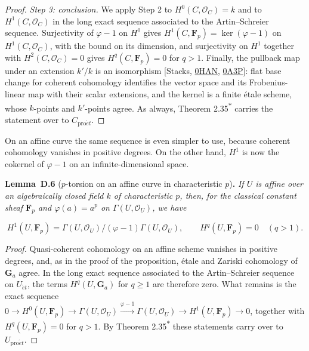 \documentclass[11pt]{article}
\newenvironment{bpstatement}[2]{\par\addvspace{0.6\baselineskip}\noindent\textbf{#1}#2\textbf{.}\enspace\ignorespaces}
  {\par\addvspace{0.4\baselineskip}}
\newenvironment{bpstatementit}[2]{\begin{bpstatement}{#1}{#2}\itshape\ignorespaces}{\end{bpstatement}}
\newcommand{\bpout}[1]{#1\textsuperscript{\hyperlink{bp-outside}{\ensuremath{\ast}}}}
\begin{document}
\begin{proof}[{Proof}]
\emph{Step 3: conclusion.} We apply Step 2 to \(H^0(C,\mathcal O_C)=k\) and to \(H^1(C,\mathcal O_C)\) in the long exact sequence associated to the Artin–Schreier sequence. Surjectivity of \(\varphi-1\) on \(H^0\) gives \(H^1(C,\mathbf F_p)=\ker(\varphi-1)\) on \(H^1(C,\mathcal O_C)\), with the bound on its dimension, and surjectivity on \(H^1\) together with \(H^2(C,\mathcal O_C)=0\) gives \(H^q(C,\mathbf F_p)=0\) for \(q>1\). Finally, the pullback map under an extension \(k'/k\) is an isomorphism [Stacks, \href{https://stacks.math.columbia.edu/tag/0HAN}{0HAN}, \href{https://stacks.math.columbia.edu/tag/0A3P}{0A3P}]: flat base change for coherent cohomology identifies the vector space and its Frobenius-linear map with their scalar extensions, and the kernel is a finite étale scheme, whose \(k\)-points and \(k'\)-points agree. As always, Theorem \bpout{2.35} carries the statement over to \(C_{\mathrm{pro}\acute{e}t}\).
\end{proof}

\label{bp191}%
On an affine curve the same sequence is even simpler to use, because coherent cohomology vanishes in positive degrees. On the other hand, \(H^1\) is now the cokernel of \(\varphi-1\) on an infinite-dimensional space.

\label{bp192}%
\begin{bpstatementit}{Lemma~D.6}{ ($p$-torsion on an affine curve in characteristic $p$)}
If \(U\) is affine over an algebraically closed field \(k\) of characteristic \(p\), then, for the classical constant sheaf \(\mathbf F_p\) and \(\varphi(a)=a^p\) on \(\Gamma(U,\mathcal O_U)\), we have

\[
H^1(U,\mathbf F_p)=
\Gamma(U,\mathcal O_U)/(\varphi-1)\Gamma(U,\mathcal O_U),\qquad
H^q(U,\mathbf F_p)=0\quad(q>1).
\]
\end{bpstatementit}

\begin{proof}[{Proof}]\label{bp193}%
Quasi-coherent cohomology on an affine scheme vanishes in positive degrees, and, as in the proof of the proposition, étale and Zariski cohomology of \(\mathbf G_a\) agree. In the long exact sequence associated to the Artin–Schreier sequence on \(U_{\acute{e}t}\), the terms \(H^q(U,\mathbf G_a)\) for \(q\geq1\) are therefore zero. What remains is the exact sequence \(0\to H^0(U,\mathbf F_p)\to\Gamma(U,\mathcal O_U)\xrightarrow{\varphi-1}\Gamma(U,\mathcal O_U)\to H^1(U,\mathbf F_p)\to0\), together with \(H^q(U,\mathbf F_p)=0\) for \(q>1\).  By Theorem \bpout{2.35} these statements carry over to \(U_{\mathrm{pro}\acute{e}t}\).
\end{proof}
\end{document}

